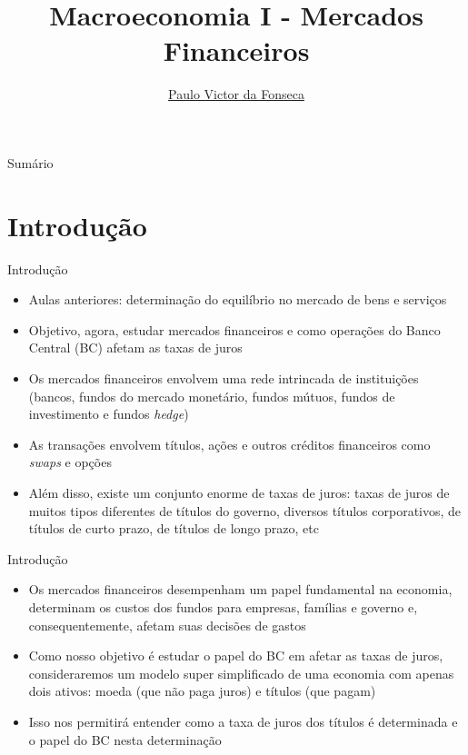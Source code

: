 \documentclass[10pt]{beamer}
\title[]{Macroeconomia I - Mercados Financeiros}
\author[]{\href{https://pvfonseca.github.io}{Paulo Victor da Fonseca}}
\date{}
\begin{document}
\begin{frame}[plain]
\end{frame}

\begin{frame}{Sumário}
    \tableofcontents
\end{frame}

\section{Introdução}
\begin{frame}{Introdução}
    \begin{itemize}
        \item Aulas anteriores: determinação do equilíbrio no mercado de bens e serviços
        \bigskip
        \item Objetivo, agora, estudar mercados financeiros e como operações do Banco Central (BC) afetam as taxas de juros
        \bigskip
        \item Os mercados financeiros envolvem uma rede intrincada de instituições (bancos, fundos do mercado monetário, fundos mútuos, fundos de investimento e fundos \emph{hedge})
        \bigskip
        \item As transações envolvem títulos, ações e outros créditos financeiros como \emph{swaps} e opções
        \bigskip
        \item Além disso, existe um conjunto enorme de taxas de juros: taxas de juros de muitos tipos diferentes de títulos do governo, diversos títulos corporativos, de títulos de curto prazo, de títulos de longo prazo, etc
    \end{itemize}
\end{frame}

\begin{frame}{Introdução}
    \begin{itemize}
        \item Os mercados financeiros desempenham um papel fundamental na economia, determinam os custos dos fundos para empresas, famílias e governo e, consequentemente, afetam suas decisões de gastos
        \bigskip
        \item Como nosso objetivo é estudar o papel do BC em afetar as taxas de juros, consideraremos um modelo super simplificado de uma economia com apenas dois ativos: moeda (que não paga juros) e títulos (que pagam)
        \bigskip
        \item Isso nos permitirá entender como a taxa de juros dos títulos é determinada e o papel do BC nesta determinação
    \end{itemize}
\end{frame}
\end{document}
